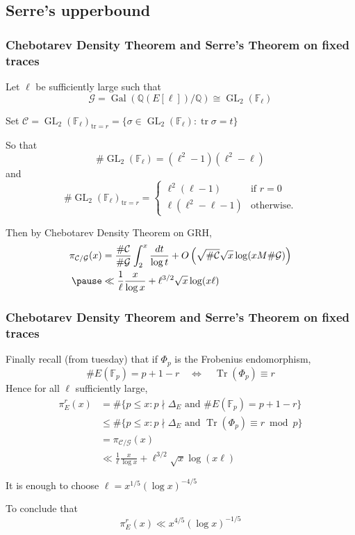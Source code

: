 \documentclass[10pt,handout]{beamer} %
\newcommand{\Q}{\mathbb Q}
\newcommand{\F}{\mathbb F}
\theoremstyle{definition}
\begin{document}
\subsection{Serre's upperbound}

\begin{frame}
\frametitle{Chebotarev Density Theorem and Serre's Theorem on fixed traces} 

Let $\ell$ be sufficiently large such that 
$$\mathcal G=\operatorname{Gal}(\Q(E[\ell])/\Q)\cong\operatorname{GL}_2(\F_\ell)$$\pause

Set
$\mathcal C=\operatorname{GL}_2(\F_\ell)_{\text{tr}=r}=\{\sigma\in\operatorname{GL}_2(\F_\ell):\operatorname{tr}\sigma=t\}$
\pause

So that
$$\#\operatorname{GL}_2(\F_\ell)=(\ell^2-1)(\ell^2-\ell)$$
\pause
and\pause
$$\#\operatorname{GL}_2(\F_\ell)_{\text{tr}=r}=\begin{cases}
                   \ell^2(\ell-1) & \text{if } r=0\\
                   \ell(\ell^2-\ell-1) & \text{otherwise.}
                  \end{cases}$$
\pause

Then by Chebotarev Density Theorem on GRH, 
\begin{align*}
 \pi_{\mathcal C/\mathcal G}(x)&=
\frac{\#\mathcal C}{\#\mathcal G}\int_2^x\frac{dt}{\log t}+O\left(\sqrt{\#\mathcal C}\sqrt{x}\log(xM\#\mathcal G)\right)\\\pause
&\ll \frac{1}{\ell}\frac{x}{\log x}+\ell^{3/2}\sqrt{x}\log(x\ell)   
\end{align*}
\end{frame}
\begin{frame}
\frametitle{Chebotarev Density Theorem and Serre's Theorem on fixed traces} 

Finally recall (from tuesday) that if $\Phi_p$ is the Frobenius endomorphism,\pause
$$\# E(\F_p)=p+1-r\quad\Longleftrightarrow\quad\operatorname{Tr}(\Phi_p)\equiv r$$\pause
Hence for all $\ell$ sufficiently large,\pause
\begin{align*}\pi_E^r(x)&=\#\{p\le x: p\nmid\Delta_E\text{ and } \# E(\F_p)=p+1-r\}\\
 &\le \#\{p\le x: p\nmid\Delta_E\text{ and } \operatorname{Tr}(\Phi_p)\equiv r\bmod p\}\\
 &=\pi_{\mathcal C/\mathcal G}(x)\\
 &\ll  \frac{1}{\ell}\frac{x}{\log x}+\ell^{3/2}\sqrt{x}\log(x\ell)
\end{align*}\pause

It is enough to choose $\ell=x^{1/5}(\log x)^{-4/5}$\pause

To conclude that
$$\pi_E^r(x)\ll x^{4/5}(\log x)^{-1/5}$$
\end{frame}
\end{document}
